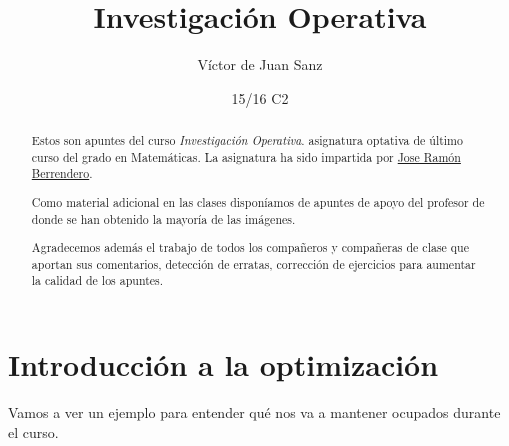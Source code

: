 \documentclass[palatino,nochap]{apuntes}
\title{Investigación Operativa}
\author{Víctor de Juan Sanz}
\date{15/16 C2}
\begin{document}
\begin{abstract}
Estos son apuntes del curso \textit{Investigación Operativa}. asignatura optativa de último curso del grado en Matemáticas. La asignatura ha sido impartida por \href{http://www.uam.es/joser.berrendero}{Jose Ramón Berrendero}. 


Como material adicional en las clases disponíamos de apuntes de apoyo del profesor de donde se han obtenido la mayoría de las imágenes.

Agradecemos además el trabajo de todos los compañeros y compañeras de clase que aportan sus comentarios, detección de erratas, corrección de ejercicios para aumentar la calidad de los apuntes.

\end{abstract}
\pagestyle{plain}
\maketitle

\tableofcontents
\newpage

\section{Introducción a la optimización}

Vamos a ver un ejemplo para entender qué nos va a mantener ocupados durante el curso.
\end{document}
